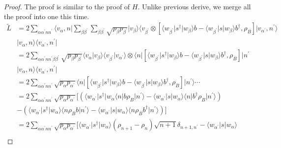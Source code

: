 \documentclass[../../note.tex]{subfiles}
\begin{document}
\begin{proof}
    The proof is similar to the proof of $H$. Unlike previous derive, we merge all the proof into one this time.
    \begin{align}
        \tilde{L}
        &= 2 \sum_{\alpha \alpha^\prime n n^\prime} \langle v_{\alpha}, n \vert \sum_{\beta \beta^\prime} \sum_{\beta \beta^\prime} \sqrt{p_{\beta} p_{\beta^\prime}} \vert v_{\beta} \rangle \langle v_{\beta^\prime} \otimes [\langle w_{\beta^\prime} \vert s^\dagger \vert w_{\beta} \rangle b - \langle w_{\beta^\prime} \vert s \vert w_{\beta} \rangle b^\dagger, \rho_B] \vert v_{\alpha^\prime}, n^\prime \rangle \nonumber \\
        &\vert v_{\alpha}, n \rangle \langle v_{\alpha^\prime}, n^\prime \vert \\
        &= 2 \sum_{\alpha \alpha^\prime n n^\prime \beta \beta^\prime} \sqrt{p_{\beta} p_{\beta^\prime}} \langle v_{\alpha} \vert v_{\beta} \rangle \langle v_{\beta^\prime} \vert v_{\alpha^\prime} \rangle \otimes \langle n \vert [\langle w_{\beta^\prime} \vert s^\dagger \vert w_{\beta} \rangle b - \langle w_{\beta^\prime} \vert s \vert w_{\beta} \rangle b^\dagger, \rho_B] \vert n^\prime \nonumber \\
        &\vert v_{\alpha}, n \rangle \langle v_{\alpha^\prime}, n^\prime \vert \\
        &= 2 \sum_{\alpha \alpha^\prime n n^\prime} \sqrt{p_{\alpha} p_{\alpha^\prime}} \langle n \vert [\langle w_{\beta^\prime} \vert s^\dagger \vert w_{\beta} \rangle b - \langle w_{\beta^\prime} \vert s \vert w_{\beta} \rangle b^\dagger, \rho_B] \vert n^\prime \rangle \cdots \\
        &= 2 \sum_{\alpha \alpha^\prime n n^\prime} \sqrt{p_{\alpha} p_{\alpha^\prime}} [ (\langle w_{\alpha^\prime} \vert s^\dagger \vert w_{\alpha} \langle n \vert b \rho_B \vert n^\prime \rangle - \langle w_{\alpha^\prime} \vert s \vert w_{\alpha} \rangle \langle n \vert b^\dagger \rho_B \vert n^\prime \rangle) \nonumber \\
        &- (\langle w_{\alpha^\prime} \vert s^\dagger \vert w_{\alpha} \rangle \langle n \rho_B b \vert n^\prime \rangle - \langle w_{\alpha^\prime} \vert s \vert w_{\alpha} \rangle \langle n \rho_B b^\dagger \vert n^\prime \rangle) ] \\
        &= 2 \sum_{\alpha \alpha^\prime n n^\prime} \sqrt{p_{\alpha} p_{\alpha^\prime}} [\langle w_{\alpha^\prime} \vert s^\dagger \vert w_{\alpha} \rangle(\rho_{n+1} - \rho_n) \sqrt{n+1} \delta_{n+1, n^\prime} - \langle w_{\alpha^\prime} \vert s \vert w_{\alpha} \rangle \nonumber \\

\end{align}
\end{proof}
\end{document}
